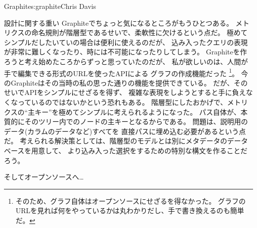 \begin{aosachapter}{Graphite}{s:graphite}{Chris Davis}
\begin{aosasect1}{設計に関する重い}
Graphiteでちょっと気になるところがもうひとつある。
メトリクスの命名規則が階層型であるせいで、柔軟性に欠けるという点だ。
極めてシンプルだしたいていの場合は便利に使えるのだが、
込み入ったクエリの表現が非常に難しくなったり、時には不可能になったりしてしまう。
Graphiteを作ろうと考え始めたころからずっと思っていたのだが、
私が欲しいのは、人間が手で編集できる形式のURLを使ったAPIによる
グラフの作成機能だった
\footnote{そのため、グラフ自体はオープンソースにせざるを得なかった。
グラフのURLを見れば何をやっているかは丸わかりだし、手で書き換えるのも簡単だ。}。
今のGraphiteはその当時の私の思った通りの機能を提供できている。
だが、そのせいでAPIをシンプルにせざるを得ず、
複雑な表現をしようとすると手に負えなくなっているのではないかという恐れもある。
階層型にしたおかげで、メトリクスの``主キー''を極めてシンプルに考えられるようになった。
パス自体が、本質的にそのツリー内でのノードの主キーとなるからである。
問題は、説明用のデータ(カラムのデータなど)すべてを
直接パスに埋め込む必要があるという点だ。
考えられる解決策としては、階層型のモデルとは別にメタデータのデータベースを用意して、
より込み入った選択をするための特別な構文を作ることだろう。

\end{aosasect1}

\begin{aosasect1}{そしてオープンソースへ…}


\end{aosasect1}
\end{aosachapter}
